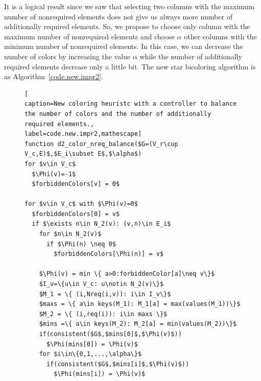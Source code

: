 \documentclass[11pt, twoside,a4paper]{book}
\newcommand{\coderef}[1]{Algorithm~\protect\ref{#1}}
\begin{document}
It is a logical result since we saw that selecting two columns with the maximum number of nonrequired
elements does not give us always more number of additionally required elements.
So, we propose to choose only column with the maximum number of nonrequired elements and
choose $\alpha$ other columns with the minimum number of nonrequired elements. In this case,
we can decrease the number of colors by increasing the value $\alpha$ while the number of
additionally required elements decrease only a little bit.
The new star bicoloring algorithm is as \coderef{code.new.impr2}.
\begin{figure}
\begin{lstlisting}[
caption=New coloring heuristc with a controller to balance
the number of colors and the number of additionally required elements.,
label=code.new.impr2,mathescape]
function d2_color_nreq_balance($G=(V_r\cup V_c,E)$,$E_i\subset E$,$\alpha$)
for $v\in V_c$
  $\Phi(v)=-1$
  $forbiddenColors[v] = 0$

for $v\in V_c$ with $\Phi(v)=0$
  $forbiddenColors[0] = v$
  if $\exists n\in N_2(v): (v,n)\in E_i$
    for $n\in N_2(v)$
      if $\Phi(n) \neq 0$
        $forbiddenColors[\Phi(n)] = v$

    $\Phi(v) = min \{ a>0:forbiddenColor[a]\neq v\}$
    $I_v=\{u\in V_c: u\notin N_2(v)\}$
    $M_1 = \{ (i,Nreq(i,v)): i\in I_v\}$
    $maxs = \{ a\in keys(M_1): M_1[a] = max(values(M_1))\}$
    $M_2 = \{ (i,req(i)): i\in maxs \}$
    $mins =\{ a\in keys(M_2): M_2[a] = min(values(M_2))\}$
    if(consistent($G$,$mins[0]$,$\Phi(v)$))
      $\Phi(mins[0]) = \Phi(v)$
    for $i\in\{0,1,...,\alpha\}$
      if(consistent($G$,$mins[i]$,$\Phi(v)$))
        $\Phi(mins[i]) = \Phi(v)$
\end{lstlisting}
\end{figure}
\end{document}
